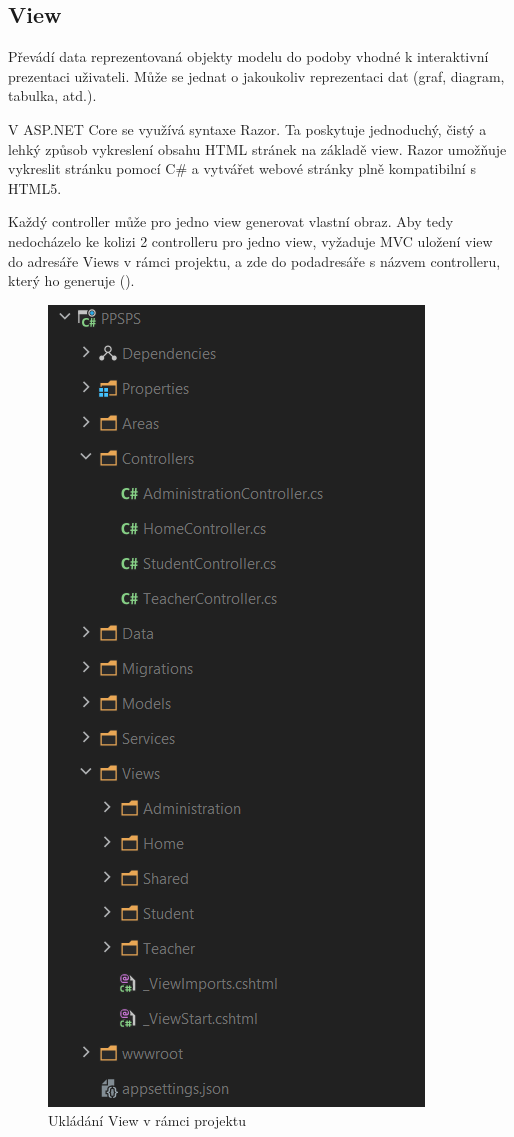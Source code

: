 \documentclass[a4paper, 12pt]{report}
\begin{document}
	\subsection{View}
	Převádí data reprezentovaná objekty modelu do podoby vhodné k interaktivní prezentaci uživateli.\cite{MVC_Wiki_CZ} Může se jednat o jakoukoliv reprezentaci dat (graf, diagram, tabulka, atd.).\par
	V ASP.NET Core se využívá syntaxe Razor. Ta poskytuje jednoduchý, čistý a lehký způsob vykreslení obsahu HTML stránek na základě view. Razor umožňuje vykreslit stránku pomocí C\# a vytvářet webové stránky plně kompatibilní s HTML5.\cite{MVC_Wiki_EN}\par
	Každý controller může pro jedno view generovat vlastní obraz. Aby tedy nedocházelo ke kolizi 2 controlleru pro jedno view, vyžaduje  MVC uložení view do adresáře Views v rámci projektu, a zde do podadresáře s názvem controlleru, který ho generuje ().
	\begin{figure}[H]
		\centering
		\includegraphics[scale=0.7]{ViewsController}
		\caption{Ukládání View v rámci projektu}
		\label{ViewsController}
	\end{figure}
\end{document}
